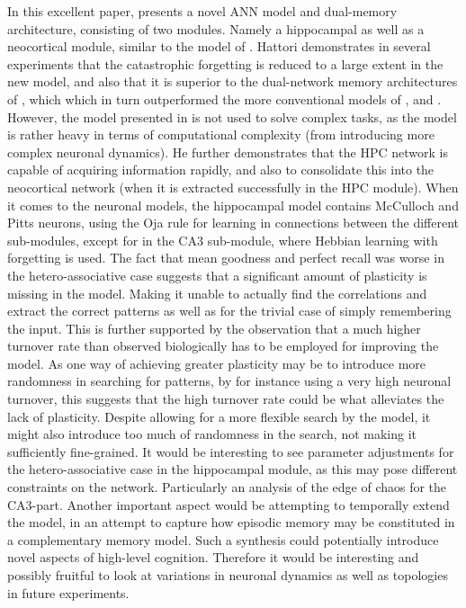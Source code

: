 In this excellent paper, \cite{Hattori2014} presents a novel ANN model and dual-memory architecture, consisting of two modules. Namely a hippocampal as well as a neocortical module, similar to the model of \cite{McClelland1995}. Hattori demonstrates in several experiments that the catastrophic forgetting is reduced to a large extent in the new model, and also that it is superior to the dual-network memory architectures of \cite{Hattori2010}, which which in turn outperformed the more conventional models of \cite{Ans1997}, and \cite{French1997}. However, the model presented in \cite{Hattori2014} is not used to solve complex tasks, as the model is rather heavy in terms of computational complexity (from introducing more complex neuronal dynamics). He further demonstrates that the HPC network is capable of acquiring information rapidly, and also to consolidate this into the neocortical network (when it is extracted successfully in the HPC module).
When it comes to the neuronal models, the hippocampal model contains McCulloch and Pitts neurons, using the Oja rule for learning in connections between the different sub-modules, except for in the CA3 sub-module, where Hebbian learning with forgetting is used.
The fact that mean goodness and perfect recall was worse in the hetero-associative case suggests that a significant amount of plasticity is missing in the model. Making it unable to actually find the correlations and extract the correct patterns as well as for the trivial case of simply remembering the input. This is further supported by the observation that a much higher turnover rate than observed biologically has to be employed for improving the model. As one way of achieving greater plasticity may be to introduce more randomness in searching for patterns, by for instance using a very high neuronal turnover, this suggests that the high turnover rate could be what alleviates the lack of plasticity. Despite allowing for a more flexible search by the model, it might also introduce too much of randomness in the search, not making it sufficiently fine-grained. It would be interesting to see parameter adjustments for the hetero-associative case in the hippocampal module, as this may pose different constraints on the network. Particularly an analysis of the edge of chaos for the CA3-part. Another important aspect would be attempting to temporally extend the model, in an attempt to capture how episodic memory may be constituted in a complementary memory model. Such a synthesis could potentially introduce novel aspects of high-level cognition. Therefore it would be interesting and possibly fruitful to look at variations in neuronal dynamics as well as topologies in future experiments.


